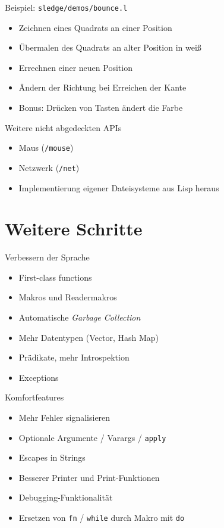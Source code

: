 \documentclass[presentation]{beamer}
\begin{document}
\begin{frame}[fragile,label=sec-4-13]{Beispiel: \texttt{sledge/demos/bounce.l}}
 \begin{itemize}
\item Zeichnen eines Quadrats an einer Position
\item Übermalen des Quadrats an alter Position in weiß
\item Errechnen einer neuen Position
\item Ändern der Richtung bei Erreichen der Kante
\item Bonus: Drücken von Tasten ändert die Farbe
\end{itemize}
\end{frame}

\begin{frame}[fragile,label=sec-4-14]{Weitere nicht abgedeckten APIs}
 \begin{itemize}
\item Maus (\texttt{/mouse})
\item Netzwerk (\texttt{/net})
\item Implementierung eigener Dateisysteme aus Lisp heraus
\end{itemize}
\end{frame}

\section{Weitere Schritte}
\label{sec-5}

\begin{frame}[label=sec-5-1]{Verbessern der Sprache}
\begin{itemize}
\item First-class functions
\item Makros und Readermakros
\item Automatische \emph{Garbage Collection}
\item Mehr Datentypen (Vector, Hash Map)
\item Prädikate, mehr Introspektion
\item Exceptions
\end{itemize}
\end{frame}

\begin{frame}[fragile,label=sec-5-2]{Komfortfeatures}
 \begin{itemize}
\item Mehr Fehler signalisieren
\item Optionale Argumente / Varargs / \texttt{apply}
\item Escapes in Strings
\item Besserer Printer und Print-Funktionen
\item Debugging-Funktionalität
\item Ersetzen von \texttt{fn} / \texttt{while} durch Makro mit \texttt{do}
\end{itemize}
\end{frame}
\end{document}

